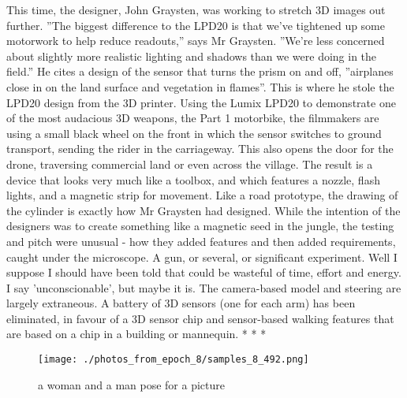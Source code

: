 \documentclass{article}%
\begin{document}
This time, the designer, John Graysten, was working to stretch 3D images out further. ''The biggest difference to the LPD20 is that we've tightened up some motorwork to help reduce readouts,'' says Mr Graysten. ''We're less concerned about slightly more realistic lighting and shadows than we were doing in the field.''\newline%
He cites a design of the sensor that turns the prism on and off, ''airplanes close in on the land surface and vegetation in flames''. This is where he stole the LPD20 design from the 3D printer.\newline%
Using the Lumix LPD20 to demonstrate one of the most audacious 3D weapons, the Part 1 motorbike, the filmmakers are using a small black wheel on the front in which the sensor switches to ground transport, sending the rider in the carriageway. This also opens the door for the drone, traversing commercial land or even across the village.\newline%
The result is a device that looks very much like a toolbox, and which features a nozzle, flash lights, and a magnetic strip for movement. Like a road prototype, the drawing of the cylinder is exactly how Mr Graysten had designed.\newline%
While the intention of the designers was to create something like a magnetic seed in the jungle, the testing and pitch were unusual {-} how they added features and then added requirements, caught under the microscope. A gun, or several, or significant experiment. Well I suppose I should have been told that could be wasteful of time, effort and energy. I say 'unconscionable', but maybe it is.\newline%
The camera{-}based model and steering are largely extraneous. A battery of 3D sensors (one for each arm) has been eliminated, in favour of a 3D sensor chip and sensor{-}based walking features that are based on a chip in a building or mannequin.\newline%
* * *\newline%

%


\begin{figure}[h!]%
\centering%
\texttt{[image: ./photos\_from\_epoch\_8/samples\_8\_492.png]}%
\caption{a woman and a man pose for a picture}%
\end{figure}

%
\end{document}
